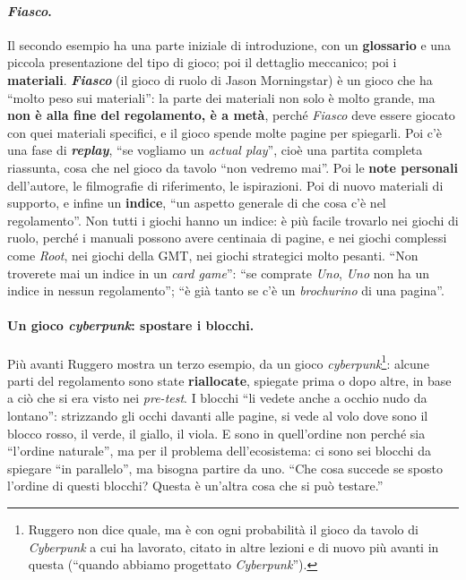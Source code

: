 \paragraph{\emph{Fiasco}.} Il secondo esempio ha una parte iniziale di introduzione, con
un \textbf{glossario} e una piccola presentazione del tipo di gioco; poi il dettaglio
meccanico; poi i \textbf{materiali}. \textbf{\emph{Fiasco}} (il gioco di ruolo di Jason
Morningstar) è un gioco che ha ``molto peso sui materiali'': la parte dei materiali non
solo è molto grande, ma \textbf{non è alla fine del regolamento, è a metà}, perché
\emph{Fiasco} deve essere giocato con quei materiali specifici, e il gioco spende molte
pagine per spiegarli. Poi c'è una fase di \textbf{\emph{replay}}, ``se vogliamo un
\emph{actual play}'', cioè una partita completa riassunta, cosa che nel gioco da tavolo
``non vedremo mai''. Poi le \textbf{note personali} dell'autore, le filmografie di
riferimento, le ispirazioni. Poi di nuovo materiali di supporto, e infine un
\textbf{indice}, ``un aspetto generale di che cosa c'è nel regolamento''. Non tutti i
giochi hanno un indice: è più facile trovarlo nei giochi di ruolo, perché i manuali
possono avere centinaia di pagine, e nei giochi complessi come \emph{Root}, nei giochi
della GMT, nei giochi strategici molto pesanti. ``Non troverete mai un indice in un
\emph{card game}'': ``se comprate \emph{Uno}, \emph{Uno} non ha un indice in nessun
regolamento''; ``è già tanto se c'è un \emph{brochurino} di una pagina''.

\paragraph{Un gioco \emph{cyberpunk}: spostare i blocchi.} Più avanti Ruggero mostra un
terzo esempio, da un gioco \emph{cyberpunk}\footnote{Ruggero non dice quale, ma è con
ogni probabilità il gioco da tavolo di \emph{Cyberpunk} a cui ha lavorato, citato in
altre lezioni e di nuovo più avanti in questa (``quando abbiamo progettato
\emph{Cyberpunk}'').}: alcune parti del regolamento sono state \textbf{riallocate},
spiegate prima o dopo altre, in base a ciò che si era visto nei \emph{pre-test}. I blocchi
``li vedete anche a occhio nudo da lontano'': strizzando gli occhi davanti alle pagine,
si vede al volo dove sono il blocco rosso, il verde, il giallo, il viola. E sono in
quell'ordine non perché sia ``l'ordine naturale'', ma per il problema dell'ecosistema: ci
sono sei blocchi da spiegare ``in parallelo'', ma bisogna partire da uno. ``Che cosa
succede se sposto l'ordine di questi blocchi? Questa è un'altra cosa che si può
testare.''

